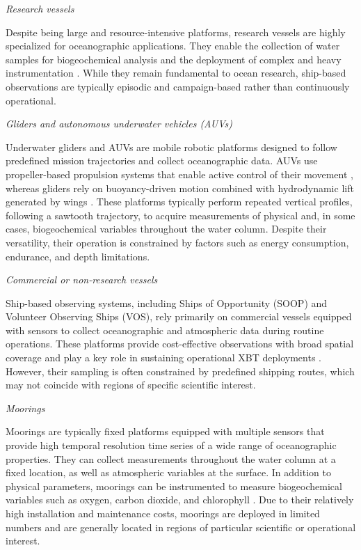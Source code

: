 \emph{Research vessels}

Despite being large and resource-intensive platforms, research vessels are highly specialized for oceanographic applications. They enable the collection of water samples for biogeochemical analysis and the deployment of complex and heavy instrumentation \parencite{satterthwaite2025essential}. While they remain fundamental to ocean research, ship-based observations are typically episodic and campaign-based rather than continuously operational.

\emph{Gliders and autonomous underwater vehicles (AUVs)}

Underwater gliders and AUVs are mobile robotic platforms designed to follow predefined mission trajectories and collect oceanographic data. AUVs use propeller-based propulsion systems that enable active control of their movement \parencite{sahoo2019advancements}, whereas gliders rely on buoyancy-driven motion combined with hydrodynamic lift generated by wings \parencite{wang2025development}. These platforms typically perform repeated vertical profiles, following a sawtooth trajectory, to acquire measurements of physical and, in some cases, biogeochemical variables throughout the water column. Despite their versatility, their operation is constrained by factors such as energy consumption, endurance, and depth limitations.

\emph{Commercial or non-research vessels}

Ship-based observing systems, including Ships of Opportunity (SOOP) and Volunteer Observing Ships (VOS), rely primarily on commercial vessels equipped with sensors to collect oceanographic and atmospheric data during routine operations. These platforms provide cost-effective observations with broad spatial coverage and play a key role in sustaining operational XBT deployments \parencite{haris2021sounding, jiang2019enhancing}. However, their sampling is often constrained by predefined shipping routes, which may not coincide with regions of specific scientific interest.

\emph{Moorings}

Moorings are typically fixed platforms equipped with multiple sensors that provide high temporal resolution time series of a wide range of oceanographic properties. They can collect measurements throughout the water column at a fixed location, as well as atmospheric variables at the surface. In addition to physical parameters, moorings can be instrumented to measure biogeochemical variables such as oxygen, carbon dioxide, and chlorophyll \parencite{bailey2019coastal}. Due to their relatively high installation and maintenance costs, moorings are deployed in limited numbers and are generally located in regions of particular scientific or operational interest.

